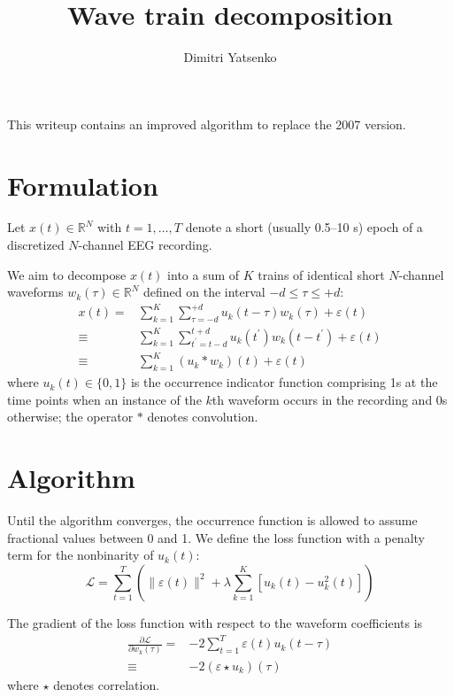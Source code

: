 \documentclass[10pt,twocolumn]{article}
\title{Wave train decomposition}
\author{Dimitri Yatsenko}
\newcommand{\R}{\mathbb R}
\begin{document}
\maketitle
This writeup contains an improved algorithm to replace the 2007 version. 

\section*{Formulation}
Let $x(t)\in \R^N$ with $t = 1,\ldots,T$ denote a short (usually 0.5--10 s) epoch of a discretized $N$-channel EEG recording.

We aim to decompose $x(t)$ into a sum of $K$ trains of identical short $N$-channel waveforms $w_k(\tau)\in \R^N$ defined on the interval $-d \le \tau \le +d$:
\begin{equation}
\begin{split}
x(t) = & 
\sum\limits_{k=1}^K \sum_{\tau=-d}^{+d} u_k(t-\tau)w_k(\tau) + \varepsilon(t)
\\
\equiv &
\sum\limits_{k=1}^K \sum_{t^\prime=t-d}^{t+d} u_k(t^\prime)w_k(t-t^\prime) + \varepsilon(t)
\\
\equiv &
\sum\limits_{k=1}^K (u_k*w_k)(t) + \varepsilon(t)
\end{split}
\end{equation}
where $u_k(t)\in \{0,1\}$ is the occurrence indicator function comprising 1s at the time points when an instance of the $k$th waveform occurs in the recording and 0s otherwise; the operator $*$ denotes convolution.

\section*{Algorithm}
Until the algorithm converges, the occurrence function is allowed to assume fractional values between 0 and 1.
We define the loss function with a penalty term for the nonbinarity of $u_k(t)$:
\begin{equation}
\mathcal L = 
\sum\limits_{t=1}^T\left(\|\varepsilon(t)\|^2 
+ \lambda \sum\limits_{k=1}^K \left[u_k(t)-u_k^2(t)\right]\right) 
\end{equation}

The gradient of the loss function with respect to the waveform coefficients is 
\begin{equation}
\begin{split}
\frac{\partial \mathcal L}{\partial w_k(\tau)} 
= & -2\sum\limits_{t=1}^T \varepsilon(t) u_k(t-\tau)
\\
\equiv & -2 (\varepsilon\star u_k)(\tau)
\end{split}
\end{equation}
where $\star$ denotes correlation.
\end{document}
